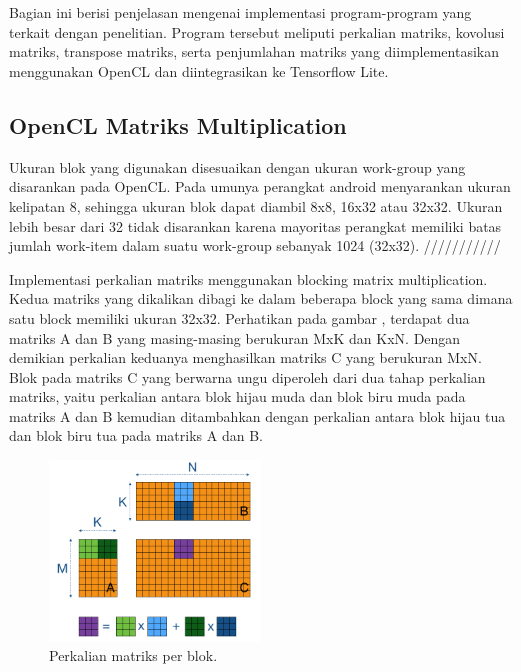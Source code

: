 \chapter{\babEmpat}
Bagian ini berisi penjelasan mengenai implementasi program-program yang terkait dengan penelitian. Program tersebut meliputi perkalian matriks, kovolusi matriks, transpose matriks, serta penjumlahan matriks yang diimplementasikan menggunakan OpenCL dan diintegrasikan ke Tensorflow Lite. 

\section{OpenCL Matriks Multiplication}
Ukuran blok yang digunakan disesuaikan dengan ukuran work-group yang disarankan pada OpenCL. Pada umunya perangkat android menyarankan ukuran kelipatan 8, sehingga ukuran blok dapat diambil 8x8, 16x32 atau 32x32. Ukuran lebih besar dari 32 tidak disarankan karena mayoritas perangkat memiliki batas jumlah work-item dalam suatu work-group sebanyak 1024 (32x32).
///////////

Implementasi perkalian matriks menggunakan blocking matrix multiplication. Kedua matriks yang dikalikan dibagi ke dalam beberapa block yang sama dimana satu block memiliki ukuran 32x32. Perhatikan pada gambar , terdapat dua matriks A dan B yang masing-masing berukuran MxK dan KxN. Dengan demikian perkalian keduanya menghasilkan matriks C yang berukuran MxN. Blok pada matriks C yang berwarna ungu diperoleh dari dua tahap perkalian matriks, yaitu perkalian antara blok hijau muda dan blok biru muda pada matriks A dan B kemudian ditambahkan dengan perkalian antara blok hijau tua dan blok biru tua pada matriks A dan B.

\begin{figure}
	\centering
	\includegraphics[width=0.50\textwidth]
	{pics/matmul-block1.png}
	\caption{Perkalian matriks per blok.}
	\label{fig:matmulblock}
\end{figure}

